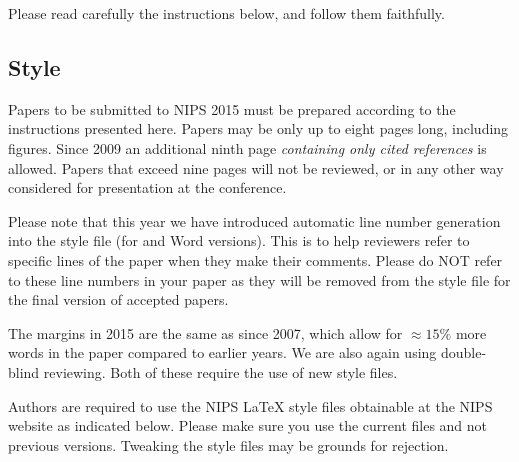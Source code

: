 \documentclass{article} %
\begin{document}
Please read carefully the
instructions below, and follow them faithfully.
\subsection{Style}

Papers to be submitted to NIPS 2015 must be prepared according to the
instructions presented here. Papers may be only up to eight pages long,
including figures. Since 2009 an additional ninth page \textit{containing only
cited references} is allowed. Papers that exceed nine pages will not be
reviewed, or in any other way considered for presentation at the conference.

Please note that this year we have introduced automatic line number generation
into the style file (for \LaTeXe and Word versions). This is to help reviewers
refer to specific lines of the paper when they make their comments. Please do
NOT refer to these line numbers in your paper as they will be removed from the
style file for the final version of accepted papers.

The margins in 2015 are the same as since 2007, which allow for $\approx 15\%$
more words in the paper compared to earlier years. We are also again using 
double-blind reviewing. Both of these require the use of new style files.

Authors are required to use the NIPS \LaTeX{} style files obtainable at the
NIPS website as indicated below. Please make sure you use the current files and
not previous versions. Tweaking the style files may be grounds for rejection.




\end{document}
